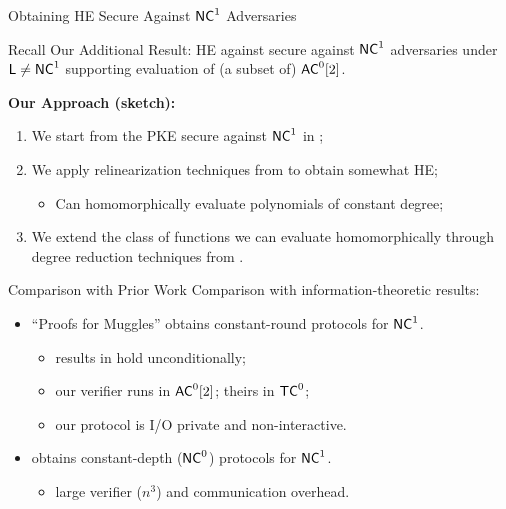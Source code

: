 \begin{frame}[t]{Obtaining HE Secure Against ${\mathsf{NC}}^1$ Adversaries}
\begin{block}{Recall Our Additional Result:}
	HE against secure against ${\mathsf{NC}}^1$ adversaries under ${\mathsf{L}} \not = {\mathsf{NC}}^1$ supporting evaluation of (a subset of) ${\mathsf{AC}}^0[2]$.
\end{block}
\pause
\bigskip
	\textbf{Our Approach (sketch):}
	\begin{enumerate}[<+- | alert@+>]
		\item We start from the PKE secure against ${\mathsf{NC}}^1$ in \cite{fgcrypto};
		\item We apply relinearization techniques from \cite{fhe-lwe} to obtain somewhat HE;
		\begin{itemize}
			\item Can homomorphically evaluate polynomials of constant degree; 
		\end{itemize}
		\item We extend the class of functions we can evaluate homomorphically through degree reduction techniques from \cite{razborov1987lower}.
	\end{enumerate}%
\end{frame}

\begin{frame}{Comparison with Prior Work}
	Comparison with information-theoretic results:
	\begin{itemize}[<+- | alert@+>]
		\item ``Proofs for Muggles'' \cite{muggles} obtains constant-round protocols for ${\mathsf{NC}}^1$.
		\begin{itemize}
			\item results in \cite{muggles} hold unconditionally; 
			\item our verifier runs in ${\mathsf{AC}}^0[2]$; theirs in ${\mathsf{TC}}^0$;
			\item our protocol is I/O private and non-interactive.
		\end{itemize}
		\item \cite{gghkr07} obtains constant-depth (${\mathsf{NC}}^0$) protocols for ${\mathsf{NC}}^1$.
		\begin{itemize}
			\item large verifier ($n^3$) and communication overhead.
		\end{itemize}
	\end{itemize}
\end{frame}
